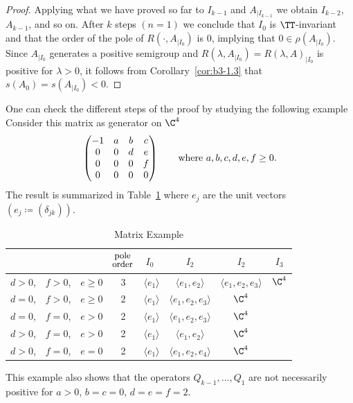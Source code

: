 \begin{proof}
	Applying what we have proved so far to $I_{k-1}$ and $A_{|I_{k-1}}$ we obtain $I_{k-2}$, $A_{k-1}$, and so on.
	After $k$ steps $(n=1)$ we conclude that $I_{0}$ is $\TT$-invariant and that the order of the pole of\/ $R(\cdot,A_{|I_{0}})$ is $0$, 
	implying that $0 \in \rho(A_{|I_{0}})$.
	Since $A_{|I_{0}}$ generates a positive semigroup and $R(\lambda,A_{|I_{0}}) = R(\lambda,A)_{|I_{0}}$ is positive for $\lambda > 0$, it follows from Corollary~\ref{cor:b3-1.3} that $s(A_{0}) = s(A_{|I_{0}}) < 0$.
\end{proof}
One can check the different steps of the proof by studying the following example
Consider this matrix as generator on $\C^{4}$
\[
\begin{pmatrix}
	-1 & a & b & c \\
	0 & 0 & d & e \\
	0 & 0 & 0 & f \\
	0 & 0 & 0 & 0
\end{pmatrix}
\quad \quad \text{where $ a,b,c,d,e,f \geq 0 $.} 
\]
The result is summarized in Table~\ref{tab:b3-table1} where 
$e_{j}$ are the unit vectors $(e_{j} \coloneqq (\delta_{jk}))$.
\begin{table}[ht!]%
% 
\begin{center}
 \caption{Matrix Example}\label{tab:b3-table1}
\begin{tabular}{p{10mm}p{10mm}p{10mm}|c|p{8mm}ccc} %
		 &&& $ \overset{\text{\small pole}}{\text{\small order}}$ & $\ I_0$ & $I_2$ & $I_2$ & $I_3$ \\[1ex]\hline
		$ d > 0 $, & $ f>0 $, &  $ e  \geq 0 $ & 3 & $\langle e_1 \rangle$ &  $\langle e_1, e_2 \rangle$ &  $\langle e_1, e_2, e_3 \rangle$ &  $\C^4$\\
		$ d = 0 $, & $ f > 0 $, & $ e  \geq 0 $ & 2 & $\langle e_1 \rangle$ &  $\langle e_1, e_2, e_3 \rangle$ &  $\C^4$ & \\	
		$ d = 0 $, & $ f = 0 $, & $ e > 0 $ & 2 & $\langle e_1 \rangle$ &  $\langle e_1, e_2, e_3 \rangle$ &  $\C^4$ & \\
		$ d > 0 $, & $ f = 0 $, & $ e > 0 $ & 2 & $\langle e_1 \rangle$ &  $\langle e_1, e_2 \rangle$ &  $\C^4$ & \\			
		$ d > 0 $, & $ f = 0 $, & $ e = 0 $ & 2 & $\langle e_1 \rangle$ &  $\langle e_1, e_2, e_4 \rangle$ &  $\C^4$ & \\	
\end{tabular}
\end{center}
\end{table}
This example also shows that the operators $Q_{k-1}, \ldots, Q_{1}$ are not necessarily positive \eg for $a>0$, $b=c=0$, $d=e=f=2$.

